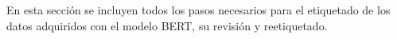 En esta sección se incluyen todos los pasos necesarios para el etiquetado de los datos adquiridos con el modelo BERT, su revisión y reetiquetado.
